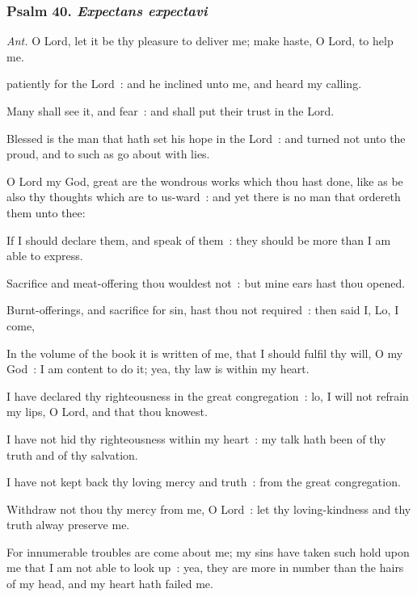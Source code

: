 \subsubsection{Psalm 40. \textit{Expectans expectavi}}\par\noindent
\textit{Ant.} O Lord, {\dag} let it be thy pleasure to deliver me; make haste, O Lord, to help me.\par
{} patiently for the Lord~: and he inclined unto me, and heard my calling.\par
{}
Many shall see it, and fear~: and shall put their trust in the Lord.\par
{}Blessed is the man that hath set his hope in the Lord~: and turned not unto the proud, and to such as go about with lies.\par
{}O Lord my God, great are the wondrous works which thou hast done, like as be also thy thoughts which are to us-ward~: and yet there is no man that ordereth them unto thee:\par
{}If I should declare them, and speak of them~: they should be more than I am able to express.\par
{}Sacrifice and meat-offering thou wouldest not~: but mine ears hast thou opened.\par
{}Burnt-offerings, and sacrifice for sin, hast thou not required~: then said I, Lo, I come,\par
{}In the volume of the book it is written of me, that I should fulfil thy will, O my God~: I am content to do it; yea, thy law is within my heart.\par
{}I have declared thy righteousness in the great congregation~: lo, I will not refrain my lips, O Lord, and that thou knowest.\par
{}I have not hid thy righteousness within my heart~: my talk hath been of thy truth and of thy salvation.\par
{}I have not kept back thy loving mercy and truth~: from the great congregation.\par
{}Withdraw not thou thy mercy from me, O Lord~: let thy loving-kindness and thy truth alway preserve me.\par
{}For innumerable troubles are come about me; my sins have taken such hold upon me that I am not able to look up~: yea, they are more in number than the hairs of my head, and my heart hath failed me.\par
